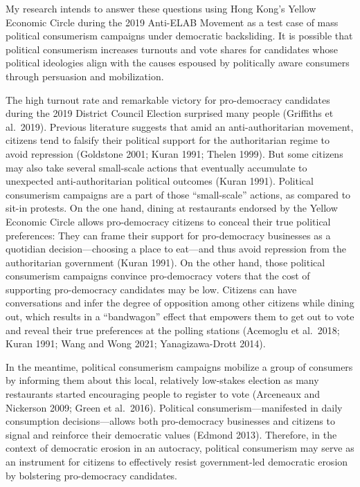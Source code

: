 \documentclass[letterpaper, 12pt]{article}
\begin{document}
My research intends to answer these questions using Hong Kong's Yellow Economic Circle during the 2019 Anti-ELAB Movement as a test case of mass political consumerism campaigns under democratic backsliding. It is possible that political consumerism increases turnouts and vote shares for candidates whose political ideologies align with the causes espoused by politically aware consumers through persuasion and mobilization. 

The high turnout rate and remarkable victory for pro-democracy candidates during the 2019 District Council Election surprised many people (Griffiths et al.\ 2019). Previous literature suggests that amid an anti-authoritarian movement, citizens tend to falsify their political support for the authoritarian regime to avoid repression (Goldstone 2001; Kuran 1991; Thelen 1999). But some citizens may also take several small-scale actions that eventually accumulate to unexpected anti-authoritarian political outcomes (Kuran 1991). Political consumerism campaigns are a part of those ``small-scale'' actions, as compared to sit-in protests. On the one hand, dining at restaurants endorsed by the Yellow Economic Circle allows pro-democracy citizens to conceal their true political preferences: They can frame their support for pro-democracy businesses as a quotidian decision---choosing a place to eat---and thus avoid repression from the authoritarian government (Kuran 1991). On the other hand, those political consumerism campaigns convince pro-democracy voters that the cost of supporting pro-democracy candidates may be low. Citizens can have conversations and infer the degree of opposition among other citizens while dining out, which results in a ``bandwagon'' effect that empowers them to get out to vote and reveal their true preferences at the polling stations (Acemoglu et al.\ 2018; Kuran 1991; Wang and Wong 2021; Yanagizawa-Drott 2014).

In the meantime, political consumerism campaigns mobilize a group of consumers by informing them about this local, relatively low-stakes election as many restaurants started encouraging people to register to vote (Arceneaux and Nickerson 2009; Green et al.\ 2016). Political consumerism---manifested in daily consumption decisions---allows both pro-democracy businesses and citizens to signal and reinforce their democratic values (Edmond 2013). Therefore, in the context of democratic erosion in an autocracy, political consumerism may serve as an instrument for citizens to effectively resist government-led democratic erosion by bolstering pro-democracy candidates. 
\end{document}
